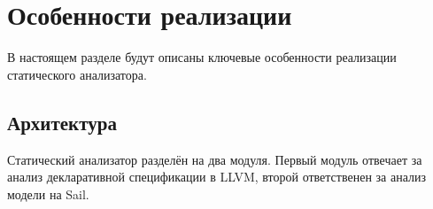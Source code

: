
\section{Особенности реализации}

В настоящем разделе будут описаны ключевые особенности реализации статического анализатора.

\subsection{Архитектура}

Статический анализатор разделён на два модуля.
Первый модуль отвечает за анализ декларативной спецификации в LLVM, второй ответственен за анализ модели на Sail.


